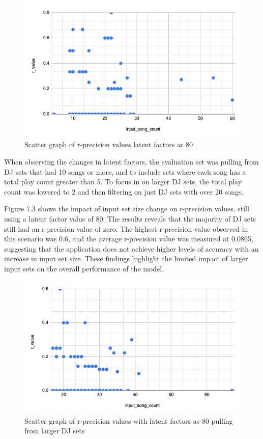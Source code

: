 \begin{figure}[H]
	\includegraphics[scale=0.6]{images/80_little_sets}
	\centering
	\caption{Scatter graph of r-precision values latent factors as 80} 
\end{figure}


When observing the changes in latent factors, the evaluation set was pulling from DJ sets that had 10 songs or more, and to include sets where each song has a total play count greater than 5. To  focus in on larger DJ sets, the total play count was lowered to 2 and then filtering on just DJ sets with over 20 songs.

Figure 7.3 shows the impact of input set size change on r-precision values, still using a latent factor value of 80. The results reveals  that the majority of DJ sets still had an r-precision value of zero. The highest r-precision value observed in this scenario was 0.6, and the average r-precision value was measured at 0.0865, suggesting that the application does not achieve higher levels of accuracy with an increase in input set size. These findings highlight the limited impact of larger input sets on the overall performance of the model.

\begin{figure}[H]
	\includegraphics[scale=0.6]{images/80_big_sets}
	\centering
	\caption{Scatter graph of r-precision values with latent factors as 80 pulling from larger DJ sets} 
\end{figure}


